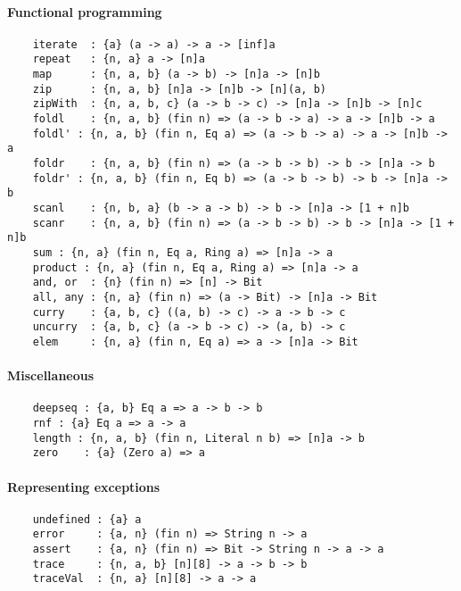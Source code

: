 \paragraph*{Functional programming}
\begin{Verbatim}
    iterate  : {a} (a -> a) -> a -> [inf]a
    repeat   : {n, a} a -> [n]a
    map      : {n, a, b} (a -> b) -> [n]a -> [n]b
    zip      : {n, a, b} [n]a -> [n]b -> [n](a, b)
    zipWith  : {n, a, b, c} (a -> b -> c) -> [n]a -> [n]b -> [n]c
    foldl    : {n, a, b} (fin n) => (a -> b -> a) -> a -> [n]b -> a
    foldl' : {n, a, b} (fin n, Eq a) => (a -> b -> a) -> a -> [n]b -> a
    foldr    : {n, a, b} (fin n) => (a -> b -> b) -> b -> [n]a -> b
    foldr' : {n, a, b} (fin n, Eq b) => (a -> b -> b) -> b -> [n]a -> b
    scanl    : {n, b, a} (b -> a -> b) -> b -> [n]a -> [1 + n]b
    scanr    : {n, a, b} (fin n) => (a -> b -> b) -> b -> [n]a -> [1 + n]b
    sum : {n, a} (fin n, Eq a, Ring a) => [n]a -> a
    product : {n, a} (fin n, Eq a, Ring a) => [n]a -> a
    and, or  : {n} (fin n) => [n] -> Bit
    all, any : {n, a} (fin n) => (a -> Bit) -> [n]a -> Bit
    curry    : {a, b, c} ((a, b) -> c) -> a -> b -> c
    uncurry  : {a, b, c} (a -> b -> c) -> (a, b) -> c
    elem     : {n, a} (fin n, Eq a) => a -> [n]a -> Bit
\end{Verbatim}
\paragraph*{Miscellaneous}
\begin{Verbatim}
    deepseq : {a, b} Eq a => a -> b -> b
    rnf : {a} Eq a => a -> a
    length : {n, a, b} (fin n, Literal n b) => [n]a -> b
    zero    : {a} (Zero a) => a
\end{Verbatim}
\paragraph*{Representing exceptions}
\begin{Verbatim}
    undefined : {a} a
    error     : {a, n} (fin n) => String n -> a
    assert    : {a, n} (fin n) => Bit -> String n -> a -> a
    trace     : {n, a, b} [n][8] -> a -> b -> b
    traceVal  : {n, a} [n][8] -> a -> a
\end{Verbatim}

